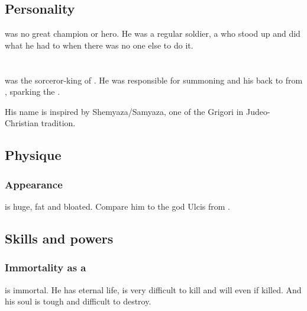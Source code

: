 \subsection{Personality}
\Morza was no great champion or hero. 
He was a regular soldier, a  who stood up and did what he had to when there was no one else to do it. 















\section[Semiza]{\Semiza}
\index{\Semiza}
\Semiza{} was the \nephilic{} sorceror-king of . 
He was responsible for summoning \Daggerrain{} and his \banes{} back to \Miith{} from \Nyx, sparking the \secondbanewar. 

His name is inspired by Shemyaza/Samyaza, one of the Grigori in Judeo-Christian tradition. 









\subsection{Physique}
\subsubsection{Appearance}
\Semiza{} is huge, fat and bloated. 
Compare him to the god Ulcis from . 









\subsection{Skills and powers}





\subsubsection{Immortality as a \Lich}
\Semiza{} is immortal. 
He has eternal life, is very difficult to kill and will  even if killed. 
And his soul is tough and difficult to destroy. 

